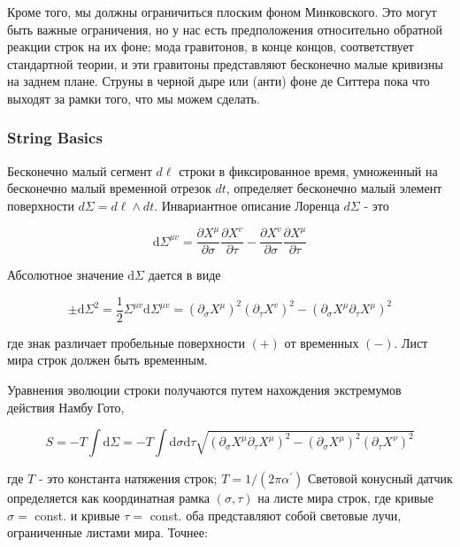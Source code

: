 \documentclass[main.tex]{subfiles}
\begin{document}
Кроме того, мы должны ограничиться плоским фоном Минковского. Это могут быть важные ограничения, но у нас есть предположения относительно обратной реакции строк на их фоне; мода гравитонов, в конце концов, соответствует стандартной теории, и эти гравитоны представляют бесконечно малые кривизны на заднем плане. Струны в черной дыре или (анти) фоне де Ситтера пока что выходят за рамки того, что мы можем сделать.



\subsubsection{String Basics}\label{ch17.3.1}

Бесконечно малый сегмент $d\ell$ строки в фиксированное время, умноженный на бесконечно малый временной отрезок $dt$, определяет бесконечно малый элемент поверхности $d\Sigma = d\ell \wedge dt$. Инвариантное описание Лоренца $d\Sigma$ - это

\begin{equation}\label{17.92}
\mathrm{d} \Sigma^{\mu v}=\frac{\partial X^{\mu}}{\partial \sigma} \frac{\partial X^{v}}{\partial \tau}-\frac{\partial X^{v}}{\partial \sigma} \frac{\partial X^{\mu}}{\partial \tau}
\end{equation}

Абсолютное значение $\mathrm{d} \Sigma$ дается в виде

\begin{equation}\label{17.93}
\pm \mathrm{d} \Sigma^{2}=\frac{1}{2} \Sigma^{\mu v} \mathrm{d} \Sigma^{\mu v}=\left(\partial_{\sigma} X^{\mu}\right)^{2}\left(\partial_{\tau} X^{v}\right)^{2}-\left(\partial_{\sigma} X^{\mu} \partial_{\tau} X^{\mu}\right)^{2}
\end{equation}

где знак различает пробельные поверхности $(+)$ от временных $(-) .$ Лист мира строк должен быть временным.

Уравнения эволюции строки получаются путем нахождения экстремумов действия Намбу Гото,

\begin{equation}\label{17.94}
S=-T \int \mathrm{d} \Sigma=-T \int \mathrm{d} \sigma \mathrm{d} \tau \sqrt{\left(\partial_{\sigma} X^{\mu} \partial_{\tau} X^{\mu}\right)^{2}-\left(\partial_{\sigma} X^{\mu}\right)^{2}\left(\partial_{\tau} X^{\nu}\right)^{2}}
\end{equation}

где $T$ - это константа натяжения строк; $T=1 /\left(2 \pi \alpha^{\prime}\right)$ Световой конусный датчик определяется как координатная рамка $(\sigma, \tau)$ на листе мира строк, где кривые $\sigma=$ const. и кривые $\tau=$ const. оба представляют собой световые лучи, ограниченные листами мира. Точнее:
\end{document}
